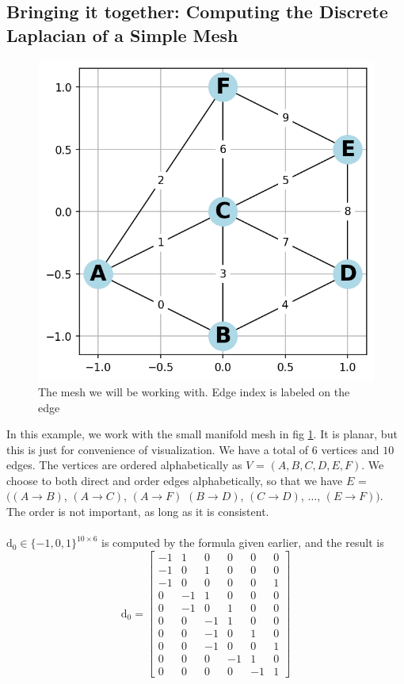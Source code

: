 \subsection*{Bringing it together: Computing the Discrete Laplacian of a Simple Mesh}
\begin{figure}[h]
    \centering
    \hspace*{-0mm}\includegraphics[width=0.9\columnwidth]{../images/dec_example_mesh.png}
    \caption{The mesh we will be working with. Edge index is labeled on the edge}
    \label{fig:dec_initial_mesh}
\end{figure}\noindent
In this example, we work with the small manifold mesh in fig \ref{fig:dec_initial_mesh}. It is planar, but this is just for convenience of visualization. We have a total of $6$ vertices and $10$ edges. The vertices are ordered alphabetically as $V$ = $(A, B, C, D, E, F)$. We choose to both direct and order edges alphabetically, so that we have $E$ = $\Big((A \to B)$, $(A \to C)$, $(A \to F)$ $(B \to D)$, $(C \to D)$, $\dots$, $(E \to F)\Big)$. The order is not important, as long as it is consistent.
\\
\\
$\text{d}_0  \in \{-1, 0, 1\}^{10 \times 6}$ is computed by the formula given earlier, and the result is
$$\text{d}_0 = \left[\begin{array}{rrrrrr}
    -1 &  1 &  0 &  0 &  0 &  0
    \\-1 &  0 &  1 &  0 &  0 &  0
    \\-1 &  0 &  0 &  0 &  0 &  1
    \\ 0 & -1 &  1 &  0 &  0 &  0
    \\ 0 & -1 &  0 &  1 &  0 &  0
    \\ 0 &  0 & -1 &  1 &  0 &  0
    \\ 0 &  0 & -1 &  0 &  1 &  0
    \\ 0 &  0 & -1 &  0 &  0 &  1
    \\ 0 &  0 &  0 & -1 &  1 &  0
    \\ 0 &  0 &  0 &  0 & -1 &  1
\end{array}\right]$$
